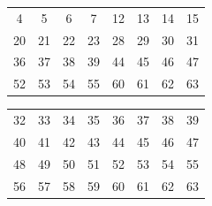 \documentclass{beamer}
\begin{document}
%
\begin{frame}
  \begin{table}[h]
    \centering
    \begin{tabular}{|c c c c c c c c|}\hline
   4  & 5  & 6  & 7  & 12 & 13 & 14 & 15 \\
   20 & 21 & 22 & 23 & 28 & 29 & 30 & 31 \\
   36 & 37 & 38 & 39 & 44 & 45 & 46 & 47 \\
   52 & 53 & 54 & 55 & 60 & 61 & 62 & 63 \\ \hline
   \end{tabular}
  \end{table}
\end{frame}
%
\begin{frame}
  \begin{table}[h]
    \centering
    \begin{tabular}{|c c c c c c c c|}\hline
   32 & 33 & 34 & 35 & 36 & 37 & 38 & 39 \\
   40 & 41 & 42 & 43 & 44 & 45 & 46 & 47 \\
   48 & 49 & 50 & 51 & 52 & 53 & 54 & 55 \\
   56 & 57 & 58 & 59 & 60 & 61 & 62 & 63 \\ \hline
    \end{tabular}
  \end{table}
\end{frame}



\end{document}
